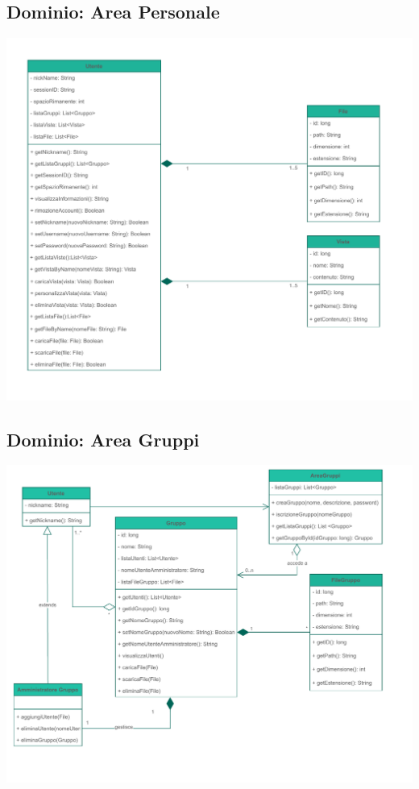 \subsection*{Dominio: Area Personale}
{}
\vspace{0.5cm}
\begin{adjustwidth}{-2cm}{0cm}
\includegraphics[scale=0.8]{progettazione/Progettazione-Area Personale.drawio.pdf}
\end{adjustwidth}
\vspace{1cm}

\subsection*{Dominio: Area Gruppi}
{}
\vspace{0.5cm}
\begin{adjustwidth}{-2cm}{0cm}
\includegraphics[scale=0.8]{progettazione/Progettazione-Area Gruppi.drawio.pdf}
\end{adjustwidth}
\vspace{1cm}


